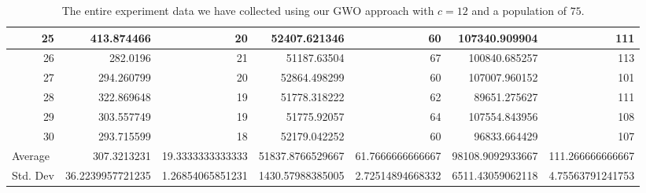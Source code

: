 \begin{table}
\begin{adjustwidth}{}{}
{{\begin{tabular}{|r|r|r|r|r|r|r|}
					\hline
					25                                         & 413.874466                   & 20                                    & 52407.621346                   & 60                                    & 107340.909904                & 111                                    \\ 
					\hline
					26                                         & 282.0196                     & 21                                    & 51187.63504                    & 67                                    & 100840.685257                & 113                                    \\ 
					\hline
					27                                         & 294.260799                   & 20                                    & 52864.498299                   & 60                                    & 107007.960152                & 101                                    \\ 
					\hline
					28                                         & 322.869648                   & 19                                    & 51778.318222                   & 62                                    & 89651.275627                 & 111                                    \\ 
					\hline
					29                                         & 303.557749                   & 19                                    & 51775.92057                    & 64                                    & 107554.843956                & 108                                    \\ 
					\hline
					30                                         & 293.715599                   & 18                                    & 52179.042252                   & 60                                    & 96833.664429                 & 107                                    \\ 
					\hline
					\multicolumn{1}{|l|}{Average}              & 307.3213231                  & 19.3333333333333                      & 51837.8766529667               & 61.7666666666667                      & 98108.9092933667             & 111.266666666667                       \\ 
					\hline
					\multicolumn{1}{|l|}{Std. Dev}             & 36.2239957721235             & 1.26854065851231                      & 1430.57988385005               & 2.72514894668332                      & 6511.43059062118             & 4.75563791241753                       \\
					\hline
		\end{tabular}}}
	\end{adjustwidth}
	\caption{The entire experiment data we have collected using our GWO approach with $c = 12$ and a population of $75$.}
	\label{full-data-gwo-c12-p75}
\end{table}

